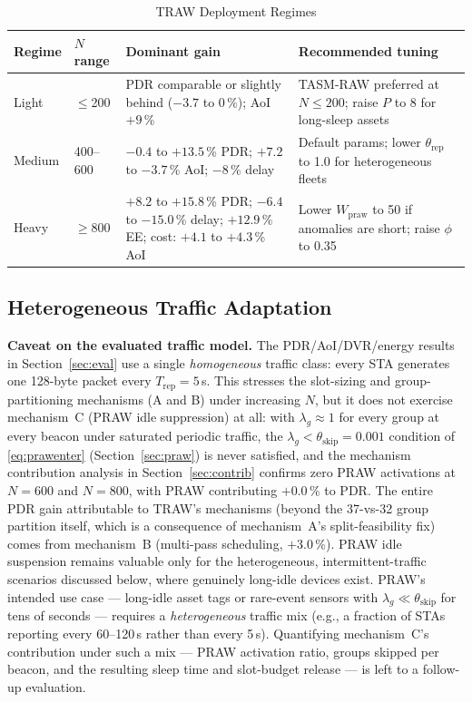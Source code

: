 \documentclass[journal]{IEEEtran}
\begin{document}
\begin{table}[!t]
\renewcommand{\arraystretch}{1.15}
\caption{TRAW Deployment Regimes}
\label{tab:regimes}
\centering
\begin{tabular}{@{}p{1.0cm}p{1.8cm}p{2.4cm}p{2.0cm}@{}}
\toprule
\textbf{Regime} & \textbf{$N$ range} & \textbf{Dominant gain} & \textbf{Recommended tuning} \\
\midrule
Light & $\leq$200 & PDR comparable or slightly behind ($-3.7$ to $0$\,\%); AoI $+9$\,\% & TASM-RAW preferred at $N\!\leq\!200$; raise $P$ to 8 for long-sleep assets \\
Medium & 400--600 & $-0.4$ to $+13.5$\,\% PDR; $+7.2$ to $-3.7$\,\% AoI; $-8$\,\% delay & Default params; lower $\theta_\mathrm{rep}$ to 1.0 for heterogeneous fleets \\
Heavy  & $\geq$800 & $+8.2$ to $+15.8$\,\% PDR; $-6.4$ to $-15.0$\,\% delay; $+12.9$\,\% EE; cost: $+4.1$ to $+4.3$\,\% AoI & Lower $W_\mathrm{praw}$ to 50 if anomalies are short; raise $\phi$ to 0.35 \\
\bottomrule
\end{tabular}
\end{table}

\subsection{Heterogeneous Traffic Adaptation}

\textbf{Caveat on the evaluated traffic model.}
The PDR/AoI/DVR/energy results in Section~\ref{sec:eval} use a single
\emph{homogeneous} traffic class: every STA generates one
128-byte packet every $T_\mathrm{rep}\!=\!5$\,s.
This stresses the slot-sizing and group-partitioning mechanisms
(A and B) under increasing $N$, but it does not exercise mechanism~C
(PRAW idle suppression) at all: with $\lambda_g\!\approx\!1$ for every
group at every beacon under saturated periodic traffic, the
$\lambda_g\!<\!\theta_\mathrm{skip}\!=\!0.001$ condition of
\eqref{eq:prawenter} (Section~\ref{sec:praw}) is never satisfied, and the
mechanism contribution analysis in Section~\ref{sec:contrib} confirms zero
PRAW activations at $N\!=\!600$ and $N\!=\!800$, with PRAW contributing
$+0.0$\,\% to PDR. The entire PDR gain attributable to TRAW's
mechanisms (beyond the 37-vs-32 group partition itself, which is a
consequence of mechanism~A's split-feasibility fix) comes from
mechanism~B (multi-pass scheduling, $+3.0$\,\%). PRAW idle suspension
remains valuable only for the heterogeneous, intermittent-traffic
scenarios discussed below, where genuinely long-idle devices exist.
PRAW's intended use case --- long-idle asset tags or rare-event
sensors with $\lambda_g\!\ll\!\theta_\mathrm{skip}$ for tens of
seconds --- requires a \emph{heterogeneous} traffic mix (e.g., a
fraction of STAs reporting every 60--120\,s rather than every 5\,s).
Quantifying mechanism~C's contribution under such a mix --- PRAW
activation ratio, groups skipped per beacon, and the resulting sleep
time and slot-budget release --- is left to a follow-up evaluation.
\end{document}
